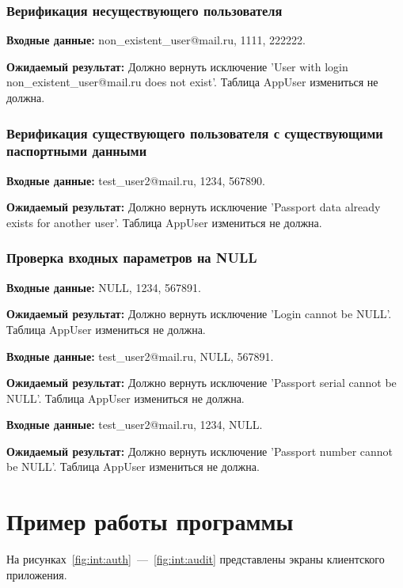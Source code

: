 \subsubsection{Верификация несуществующего пользователя}

\textbf{Входные данные:} non\_existent\_user@mail.ru, 1111, 222222.

\textbf{Ожидаемый результат:} Должно вернуть исключение 'User with login non\_existent\_user@mail.ru does not exist'. Таблица AppUser измениться не должна.

\subsubsection{Верификация существующего пользователя с существующими паспортными данными}

\textbf{Входные данные:} test\_user2@mail.ru, 1234, 567890.

\textbf{Ожидаемый результат:} Должно вернуть исключение 'Passport data already exists for another user'. Таблица AppUser измениться не должна.

\subsubsection{Проверка входных параметров на NULL}

\textbf{Входные данные:} NULL, 1234, 567891.

\textbf{Ожидаемый результат:} Должно вернуть исключение 'Login cannot be NULL'. Таблица AppUser измениться не должна.

\textbf{Входные данные:} test\_user2@mail.ru, NULL, 567891.

\textbf{Ожидаемый результат:} Должно вернуть исключение 'Passport serial cannot be NULL'. Таблица AppUser измениться не должна.

\textbf{Входные данные:} test\_user2@mail.ru, 1234, NULL.

\textbf{Ожидаемый результат:} Должно вернуть исключение 'Passport number cannot be NULL'. Таблица AppUser измениться не должна.

\section{Пример работы программы}

На рисунках~\ref{fig:int:auth}~---~\ref{fig:int:audit} представлены экраны клиентского приложения.

